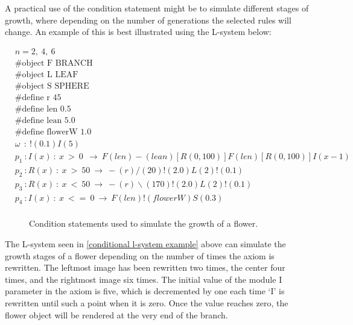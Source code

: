 \noindent
A practical use of the condition statement might be to simulate different stages of growth, where depending on the number of generations the selected rules will change. An example of this is best illustrated using the L-system below: 

\begin{singlespace}
\begin{equation} \label{conditional l-system example}
\begin{aligned}
	&n=2,~4,~6 \\
	&\#\text{object F BRANCH} \\
 	&\#\text{object L LEAF} \\
	&\#\text{object S SPHERE} \\
	&\#\text{define r 45} \\
	&\#\text{define len 0.5} \\
	&\#\text{define lean 5.0} \\
	&\#\text{define flowerW 1.0} \\
	&\omega~~ :~ !(0.1)I(5)\\
	&p_1~ :  I(x)~ :~ x~ >~ 0~~ \rightarrow~ F(len)-(lean)[R({0, 100})]F(len)[R({0, 100})]I(x-1)\\
	&p_2~ :  R(x)~ :~ x~ >~ 50~ \rightarrow~ -(r)/(20)!(2.0)L(2)!(0.1)\\
	&p_3~ :  R(x)~ :~ x~ <~ 50~ \rightarrow~ -(r)\backslash(170)!(2.0)L(2)!(0.1)\\
	&p_4~ :  I(x)~ :~ x~ <=~ 0~ \rightarrow~ F(len)!(flowerW)S(0.3)\\
\end{aligned}
\end{equation}
\end{singlespace}

\begin{figure}[htbp]
	{\centering
		\vspace{7px}
		\setlength{\fboxrule}{1pt}
		\caption{Condition statements used to simulate the growth of a flower.}
	}
\end{figure}
\FloatBarrier

\vspace{5mm}
\noindent
The L-system seen in \ref{conditional l-system example} above can simulate the growth stages of a flower depending on the number of times the axiom is rewritten. The leftmost image has been rewritten two times, the center four times, and the rightmost image six times. The initial value of the module I parameter in the axiom is five, which is decremented by one each time `I' is rewritten until such a point when it is zero. Once the value reaches zero, the flower object will be rendered at the very end of the branch. 

